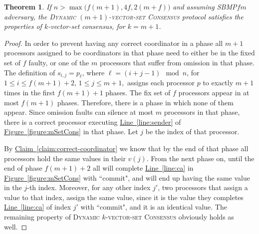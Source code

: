 \documentclass[11pt]{article}
\newtheorem{theorem}{Theorem}
\newcommand{\namedref}[2]{\hyperref[#2]{#1~\ref*{#2}}}
\newcommand{\figureref}[1]{\namedref{Figure}{#1}}
\newcommand{\claimref}[1]{\namedref{Claim}{#1}}
\newcommand{\lref}[1]{\namedref{Line}{#1}}
\newcommand{\SBMPfm}{\mbox{SBMP\!$f\!m$}\xspace}
\newcommand{\kSetCons}{\textsc{Dynamic $k$-vector-set Consensus}\xspace}
\newcommand{\mSetCons}{\textsc{Dynamic $(m+1)$-vector-set Consensus}\xspace}
\begin{document}
\begin{theorem}\label{thm:mSetCons}
If $n>\max\bigl(f(m+1), 4f, 2(m+f)\bigr)$ and assuming \SBMPfm adversary, the \mSetCons protocol satisfies the properties of $k$-vector-set consensus, for $k= m+1$.
\end{theorem}
\begin{proof}
In order to prevent having any correct coordinator in a phase all $m+1$ processors assigned to be coordinators in that phase need to either be in the fixed set of $f$ faulty, or one of the $m$ processors that suffer from omission in that phase.
The definition of $s_{i,j}=p_\ell$, where $\ell=(i+j-1)\mod n$, for $1\le i\le  f(m+1)+2$, $1\le j\le m+1,$ assigns each processor $p$ to exactly $m+1$ times in the first $f(m+1)+1$ phases.  The fix set of $f$ processors appear in at most $f(m+1)$ phases.  Therefore, there is a phase in which none of them appear.  Since omission faults can silence at most $m$ processors in that phase, there is a correct processor executing \lref{line:sender}  of \figureref{figure:mSetCons}  in that phase. Let $j$ be the index of that processor.

By \claimref{claim:correct-coordinator} we know that by the end of  that phase all processors hold the same values in their $v(j)$.  From the next phase on, until the end of phase $f(m+1)+2$ all will complete \lref{line:ca} in \figureref{figure:mSetCons} with ``commit", and will end up having the same value in the $j$-th index.  Moreover,  for any other index $j'$, two processors that  assign a value to that index, assign the same value, since it is the value they completes \lref{line:ca} of index $j'$ with ``commit", and it is an identical value.
The remaining property of \kSetCons obviously holds as well.
\end{proof}




 
\end{document}
